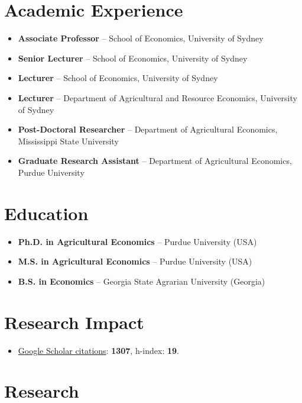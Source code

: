 \documentclass[10pt]{article}
\begin{document}
	\section*{Academic Experience}
	\begin{itemize}
		\item {} \textbf{Associate Professor} -- School of Economics, University of Sydney
		\item {} \textbf{Senior Lecturer} -- School of Economics, University of Sydney
		\item {} \textbf{Lecturer} -- School of Economics, University of Sydney
		\item {} \textbf{Lecturer} -- Department of Agricultural and Resource Economics, University of Sydney
		\item {} \textbf{Post-Doctoral Researcher} -- Department of Agricultural Economics, Mississippi State University
		\item {} \textbf{Graduate Research Assistant} -- Department of Agricultural Economics, Purdue University
	\end{itemize}
	
	\section*{Education}
	\begin{itemize}
		\item {} \textbf{Ph.D. in Agricultural Economics} -- Purdue University (USA)
		\item {} \textbf{M.S. in Agricultural Economics} -- Purdue University (USA)
		\item {} \textbf{B.S. in Economics} -- Georgia State Agrarian University (Georgia)
	\end{itemize}
	
	\section*{Research Impact}
	\begin{itemize}
		\item \href{https://scholar.google.com/citations?user=VbNOr6wAAAAJ&hl=en}{Google Scholar citations}: \textbf{1307}, h-index: \textbf{19}.
	\end{itemize}
	

	
	
	\section*{Research}
	
\end{document}
